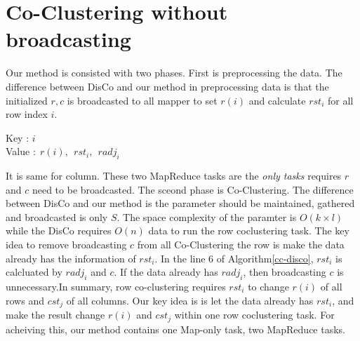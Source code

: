 \documentclass[10pt]{article}
\begin{document}
\begin{comment}
			\Begin{
				$x=$ arbitrary value of $0$ to $1$\\
				$Output(x\times NumOfReducer, value)$
			}
			IncCluster-calc-Reducer(key $key$, values $Values[]$)\\
			\Begin{
				$S_{k+1,:}=$empty array of size $l$\\
				$R(k+1)=0$\\
				\For{$value\in Values$}{
					$(1,rst_i)=value$\\
					$S_{k+1,:}=\emph{combine statistic}(S_{k+1,:},rst_i)$\\
					$R(k+1)=R(k+1)+1$
				}
				$Out(0,(R(k+1),\ \ S_{k+1,:}))$
			}
			Merge all reducer output to $R(k+1),S_{k+1,:}$\\
		}
		$k=k+1$\\
		$R(t)=R(t)-R(k+1)$\\
		Add new row vectoer $S_{k+1,:}$ to $S$.\\
		All process are same for splitting column.\\
		
		
	\end{algorithm}
	
\end{comment}
	
	\section{Co-Clustering without broadcasting~}
	Our method is consisted with two phases. First is  preprocessing the data. The difference between DisCo and our method in preprocessing data is that the initialized $r, c$ is broadcasted to all mapper to set $r(i)$ and calculate $rst_i$ for all row index $i$.
	\begin{center}
		Key : $i$\\
		Value :$\ \ r(i),\ \  rst_i, \ \ radj_i$ 
	\end{center}
	It is same for column. These two MapReduce tasks are the \emph{only tasks} requires $r$ and $c$ need to be broadcasted.\newline \newline
	The sceond phase is Co-Clustering. The difference between DisCo and our method is the parameter should be maintained, gathered and broadcasted is only $S$. The space complexity of the paramter is $O(k\times l)$ while the DisCo requires $O(n)$ data to run the row coclustering task. The key idea to remove broadcasting $c$ from all Co-Clustering the row is make the data already has the information of $rst_i$. In the line $6$ of Algorithm\ref{cc-disco}, $rst_i$ is calcluated by $radj_i$ and $c$. If the data already has $radj_i$, then broadcasting $c$ is unnecessary.\newline In summary, row co-clustering requires $rst_i$ to change $r(i)$ of all rows and $cst_j$ of all columns. Our key idea is is let the data already has $rst_i$, and make the result change $r(i)$ and $cst_j$ within one row coclustering task. For acheiving this, our method contains one Map-only task, two MapReduce tasks.
\end{document}
